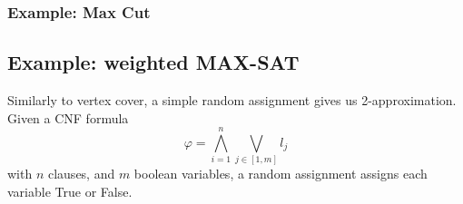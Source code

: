 \documentclass[10pt]{article}
\theoremstyle{definition}
\begin{document}
\subsubsection*{Example: Max Cut}
\begin{algorithm}[H]
  
\end{algorithm}

\subsection{Example: weighted MAX-SAT}
Similarly to vertex cover, a simple random assignment gives us 2-approximation. Given a CNF formula
\[\varphi = \bigwedge_{i = 1}^{n} \bigvee_{j \in [1, m]} l_{j}\]
with $n$ clauses, and $m$ boolean variables, a random assignment assigns each variable True or False.
\end{document}
